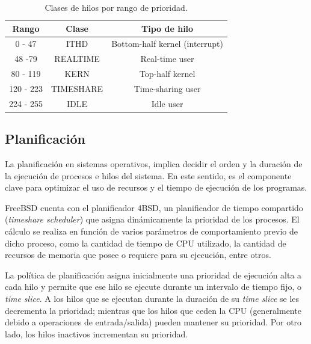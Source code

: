 \begin{table}[H]
    \centering
    \begin{tabular}{|c|c|c|}
        \hline
        \textbf{Rango} & \textbf{Clase} & \textbf{Tipo de hilo} \\
        \hline
        0 - 47 & ITHD & Bottom-half kernel (interrupt) \\
        \hline
        48 -79 & REALTIME & Real-time user \\
        \hline
        80 - 119 & KERN & Top-half kernel \\
        \hline
        120 - 223 & TIMESHARE & Time-sharing user \\
        \hline
        224 - 255 & IDLE & Idle user \\
        \hline
    \end{tabular}
    \caption{Clases de hilos por rango de prioridad.}
    \label{tabla:prio-hilos}
\end{table}


\subsection{Planificación}

La planificación en sistemas operativos, implica decidir el orden y la duración de la ejecución de procesos e hilos del sistema. En este sentido, es el componente clave para optimizar el uso de recursos y el tiempo de ejecución de los programas.\par

FreeBSD cuenta con el planificador 4BSD, un planificador de tiempo compartido (\textit{timeshare scheduler}) que asigna dinámicamente la prioridad de los procesos. El cálculo se realiza en función de varios parámetros de comportamiento previo de dicho proceso, como la cantidad de tiempo de CPU utilizado, la cantidad de recursos de memoria que posee o requiere para su ejecución, entre otros.\par

La política de planificación asigna inicialmente una prioridad de ejecución alta a cada hilo y permite que ese hilo se ejecute durante un intervalo de tiempo fijo, o \textit{time slice}. A los hilos que se ejecutan durante la duración de su \textit{time slice} se les decrementa la prioridad; mientras que los hilos que ceden la CPU (generalmente debido a operaciones de entrada/salida) pueden mantener su prioridad. Por otro lado, los hilos inactivos incrementan su prioridad.\par

